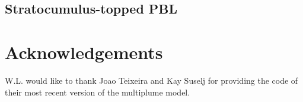 \documentclass[dvipdfmx,a4paper,10pt]{article}
\begin{document}
\subsection{Stratocumulus-topped PBL}



\section{Acknowledgements}
W.L. would like to thank Joao Teixeira and Kay Suselj for providing the code of their most recent version of the multiplume model. 




%

 
\end{document}
